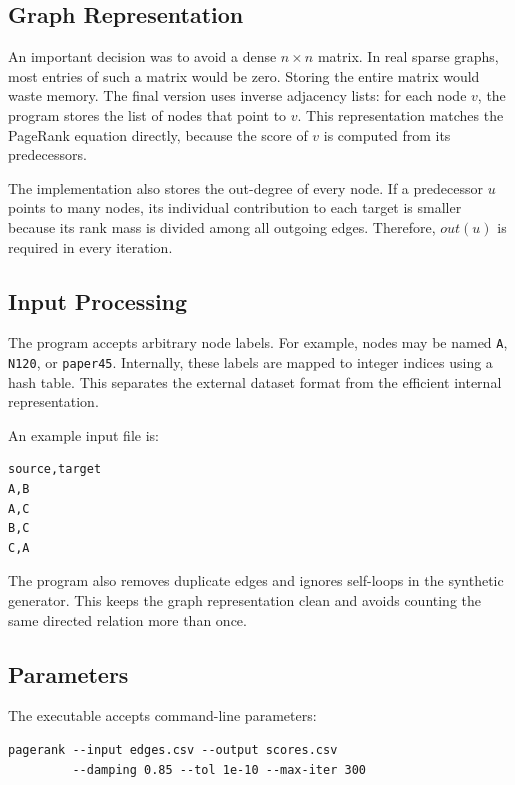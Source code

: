 \documentclass[runningheads]{llncs}
\begin{document}
\subsection{Graph Representation}

An important decision was to avoid a dense \(n\times n\) matrix. In real sparse graphs, most entries of such a matrix would be zero. Storing the entire matrix would waste memory. The final version uses inverse adjacency lists: for each node \(v\), the program stores the list of nodes that point to \(v\). This representation matches the PageRank equation directly, because the score of \(v\) is computed from its predecessors.

The implementation also stores the out-degree of every node. If a predecessor \(u\) points to many nodes, its individual contribution to each target is smaller because its rank mass is divided among all outgoing edges. Therefore, \(out(u)\) is required in every iteration.

\subsection{Input Processing}

The program accepts arbitrary node labels. For example, nodes may be named \texttt{A}, \texttt{N120}, or \texttt{paper45}. Internally, these labels are mapped to integer indices using a hash table. This separates the external dataset format from the efficient internal representation.

An example input file is:

\begin{verbatim}
source,target
A,B
A,C
B,C
C,A
\end{verbatim}

The program also removes duplicate edges and ignores self-loops in the synthetic generator. This keeps the graph representation clean and avoids counting the same directed relation more than once.

\subsection{Parameters}

The executable accepts command-line parameters:

\begin{verbatim}
pagerank --input edges.csv --output scores.csv
         --damping 0.85 --tol 1e-10 --max-iter 300
\end{verbatim}
\end{document}
